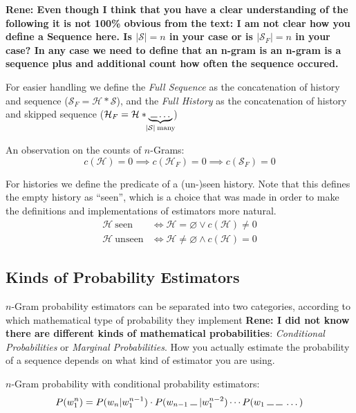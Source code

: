 \documentclass[11pt,a4paper]{article}
\newcommand{\Seq}{\mathcal{S}}
\newcommand{\Hist}{\mathcal{H}}
\newcommand{\SeqF}{\mathcal{S}_F}
\newcommand{\HistF}{\mathcal{H}_F}
\newcommand{\Skp}{\rule{7pt}{.5pt}}
\newcommand{\rp}[1]{\textbf{Rene: #1}}
\begin{document}
  \rp{Even though I think that you have a clear understanding of the following
  it is not 100\% obvious from the text: I am not clear how you define a
  Sequence here. Is $|\Seq|=n$ in your case or is $|\SeqF|=n$ in your case?
  In any case we need to define that an n-gram is an n-gram is a sequence plus
  and additional count how often the sequence occured.}

  For easier handling we define the \emph{Full Sequence} as the concatenation
  of history and sequence ($\SeqF = \Hist * \Seq$), and the \emph{Full History}
  as the concatenation of history and skipped sequence
  ($\HistF = \Hist * \underbrace{\: \Skp \dotso \:}_{\mathclap{|\Seq| \: \text{many}}}$)

  An observation on the counts of $n$-Grams:
  \begin{equation}
    c(\Hist) = 0 \implies c(\HistF) = 0 \implies c(\SeqF) = 0
  \end{equation}

  For histories we define the predicate of a (un-)seen history. Note that this
  defines the empty history as ``seen'', which is a choice that was made in
  order to make the definitions and implementations of estimators more natural.
  \begin{equation}
    \begin{aligned}
      \Hist \: \mathrm{seen} &\iff \Hist = \varnothing \lor c(\Hist) \neq 0 \\
      \Hist \: \mathrm{unseen} &\iff \Hist \neq \varnothing \land c(\Hist) = 0
    \end{aligned}
  \end{equation}

  \subsection{Kinds of Probability Estimators}

  $n$-Gram probability estimators can be separated into two categories,
  according to which mathematical type of probability they implement
  \rp{I did not know there are different kinds of mathematical probabilities}:
  \emph{Conditional Probabilities} or \emph{Marginal Probabilities}. How you
  actually estimate the probability of a sequence depends on what kind of
  estimator you are using.

  $n$-Gram probability with conditional probability estimators:
  \begin{equation}
    P(w_1^n) = P(w_n | w_1^{n-1}) \cdot P(w_{n-1} \: \Skp \: | w_1^{n-2}) \dotsm P(w_1 \: \Skp \: \Skp \: \dotso)
  \end{equation}
\end{document}
